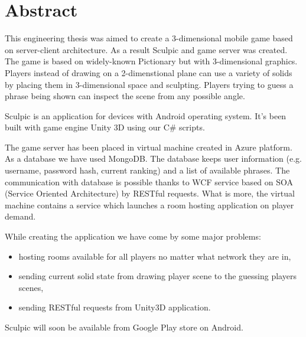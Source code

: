 \chapter*{Abstract}

This engineering thesis was aimed to create a 3-dimensional mobile game based on server-client architecture. As a result Sculpic and game server was created. The game is based on widely-known Pictionary but with 3-dimensional graphics. Players instead of drawing on a 2-dimenstional plane can use a variety of solids by placing them in 3-dimensional space and sculpting. Players trying to guess a phrase being shown can inspect the scene from any possible angle.


Sculpic is an application for devices with Android operating system. It’s been built with game engine Unity 3D using our C\# scripts.


The game server has been placed in virtual machine created in Azure platform. As a database we have used MongoDB. The database keeps user information (e.g. username, password hash, current ranking) and a list of available phrases. The communication with database is possible thanks to WCF service based on SOA (Service Oriented Architecture) by RESTful requests. What is more, the virtual machine contains a service which launches a room hosting application on player demand.


While creating the application we have come by some major problems:
\begin{itemize}
\item hosting rooms available for all players no matter what network they are in,
\item sending current solid state from drawing player scene to the guessing players scenes,
\item sending RESTful requests from Unity3D application.
\end{itemize}

Sculpic will soon be available from Google Play store on Android.

